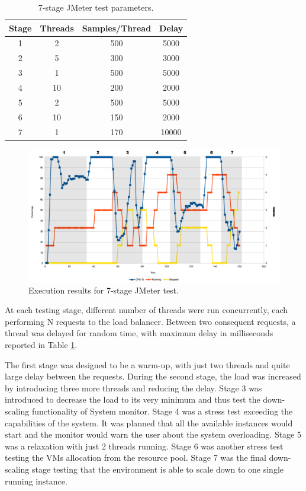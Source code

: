 \documentclass[conference]{IEEEtran}
\begin{document}
\begin{table}[ht]
\begin{center}
  \begin{tabular}{ | c | c | c | c | }
    \hline
    \textbf{Stage} & \textbf{Threads} & \textbf{Samples/Thread} & \textbf{Delay} \\ \hline
    1 & 2 & 500 & 5000 \\ \hline
    2 & 5 & 300 & 3000 \\ \hline
    3 & 1 & 500 & 5000 \\ \hline
    4 & 10 & 200 & 2000 \\ \hline
    5 & 2 & 500 & 5000 \\ \hline
    6 & 10 & 150 & 2000 \\ \hline
    7 & 1 & 170 & 10000 \\
    \hline
  \end{tabular}
  \caption{7-stage JMeter test parameters.}
  \label{table-test-parameters}
\end{center}
\end{table}

\begin{figure}
\centering
\includegraphics[width=180mm]{big_chart.png}
\caption{Execution results for 7-stage JMeter test.}
\label{fig_sim}
\end{figure}

At each testing stage, different number of threads were run concurrently, each performing N requests to the load balancer. Between two consequent requests, a thread was delayed for random time, with maximum delay in milliseconds reported in Table \ref{table-test-parameters}.

The first stage was designed to be a warm-up, with just two threads and quite large delay between the requests. During the second stage, the load was increased by introducing three more threads and reducing the delay. Stage 3 was introduced to decrease the load to its very minimum and thus test the down-scaling functionality of System monitor. Stage 4 was a stress test exceeding the capabilities of the system. It was planned that all the available instances would start and the monitor would warn the user about the system overloading. Stage 5 was a relaxation with just 2 threads running. Stage 6 was another stress test testing the VMs allocation from the resource pool. Stage 7 was the final down-scaling stage testing that the environment is able to scale down to one single running instance.
\end{document}
